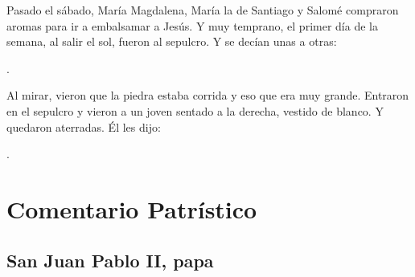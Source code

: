 
\begin{scripture}
Pasado el sábado, María Magdalena, María la de Santiago y Salomé compraron aromas para ir a embalsamar a Jesús. Y muy temprano, el primer día de la semana, al salir el sol, fueron al sepulcro. Y se decían unas a otras: 

. 

Al mirar, vieron que la piedra estaba corrida y eso que era muy grande. Entraron en el sepulcro y vieron a un joven sentado a la derecha, vestido de blanco. Y quedaron aterradas. Él les dijo: 

.
\end{scripture}


\newsection
\section{Comentario Patrístico}

\subsection{San Juan Pablo II, papa}



